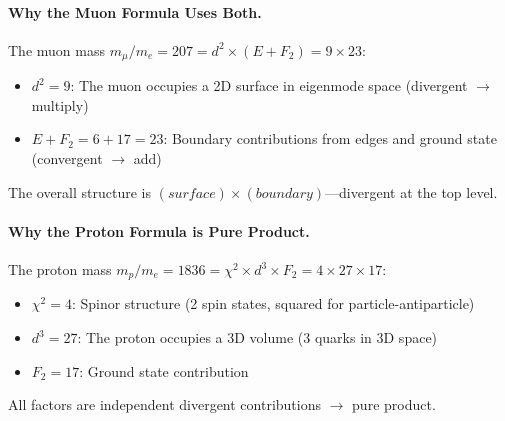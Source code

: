 \documentclass[11pt,a4paper]{book}
\def\text#1{#1}%
\begin{document}
\paragraph{Why the Muon Formula Uses Both.}

The muon mass $m_\mu / m_e = 207 = d^2 \times (E + F_2) = 9 \times 23$:
\begin{itemize}
\item $d^2 = 9$: The muon occupies a 2D surface in eigenmode space (divergent $\to$ multiply)
\item $E + F_2 = 6 + 17 = 23$: Boundary contributions from edges and ground state (convergent $\to$ add)
\end{itemize}

The overall structure is $\text{(surface)} \times \text{(boundary)}$---divergent at the top level.

\paragraph{Why the Proton Formula is Pure Product.}

The proton mass $m_p / m_e = 1836 = \chi^2 \times d^3 \times F_2 = 4 \times 27 \times 17$:
\begin{itemize}
\item $\chi^2 = 4$: Spinor structure (2 spin states, squared for particle-antiparticle)
\item $d^3 = 27$: The proton occupies a 3D volume (3 quarks in 3D space)
\item $F_2 = 17$: Ground state contribution
\end{itemize}

All factors are independent divergent contributions $\to$ pure product.
\end{document}
